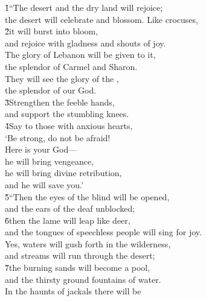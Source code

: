 \begin{poetry}
\poeml {}
\v{1}``The desert and the dry land will rejoice; \\
\poemll    the desert will celebrate and blossom. Like crocuses, \\
\poeml \v{2}it will burst into bloom, \\
\poemll    and rejoice with gladness and shouts of joy. \\
\poeml The glory of Lebanon will be given to it, \\
\poemll    the splendor of Carmel and Sharon. \\
\poeml They will see the glory of the , \\
\poemll    the splendor of our God. \\
\poeml \v{3}Strengthen the feeble hands, \\
\poemll    and support the stumbling knees. \\
\poeml \v{4}Say to those with anxious hearts, \\
\poemll    `Be strong, do not be afraid! \\
\poeml Here is your God--- \\
\poemll    he will bring vengeance, \\
\poeml he will bring divine retribution, \\
\poemll    and he will save you.' \\
\poeml \v{5}``Then the eyes of the blind will be opened, \\
\poemll    and the ears of the deaf unblocked; \\
\poeml \v{6}then the lame will leap like deer, \\
\poemll    and the tongues of speechless people will sing for joy. \\
\poeml Yes, waters will gush forth in the wilderness, \\
\poemll    and streams will run through the desert; \\
\poeml \v{7}the burning sands will become a pool, \\
\poemll    and the thirsty ground fountains of water. \\
\poeml In the haunts of jackals there will be \\

\end{poetry}
